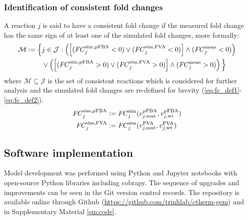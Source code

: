 \subsubsection{Identification of consistent fold changes}
A reaction $j$ is said to have a consistent fold change if the measured fold change has the same sign of at least one of the simulated fold changes, more formally:
\begin{equation} \label{eq:cons}
    \begin{aligned}
        \mathcal{M} := \Big\{ & j\in\mathcal{J}: \left( \left[ (\mathit{FC}_j^{\mathrm{sim},\mathrm{pFBA}}<0) \lor (\mathit{FC}_j^{\mathrm{sim},\mathrm{FVA}}<0) \right] \land (\mathit{FC}_j^{\mathrm{meas}}<0) \right) \\
        & \lor \left( \left[ (\mathit{FC}_j^{\mathrm{sim},\mathrm{pFBA}}>0) \lor (\mathit{FC}_j^{\mathrm{sim},\mathrm{FVA}}>0) \right] \land (\mathit{FC}_j^{\mathrm{meas}}>0) \right) \Big\}
    \end{aligned}
\end{equation}
where $\mathcal{M} \subseteq \mathcal{J}$ is the set of consistent reactions which is considered for further analysis and the simulated fold changes are re-defined for brevity (\ref{eq:fc_def1}-\ref{eq:fc_def2}).
\begin{alignat}{3}
    \mathit{FC}_j^{\mathrm{sim},\mathrm{pFBA}} &:= \mathit{FC}_j^{\mathrm{sim}} (v_{j,\text{mut}}^{\mathrm{pFBA}}, v_{j,\text{wt}}^{\mathrm{pFBA}}) \label{eq:fc_def1}\\
    \mathit{FC}_j^{\mathrm{sim},\mathrm{FVA}} &:= \mathit{FC}_j^{\mathrm{sim}} (v_{j,\text{mut}}^{\mathrm{FVA}}, v_{j,\text{wt}}^{\mathrm{FVA}}) \label{eq:fc_def2}
\end{alignat}


\subsection{Software implementation}
Model development was performed using Python and Jupyter notebooks with open-source Python libraries including cobrapy.\citep{ebrahim2016}
The sequence of upgrades and improvements can be seen in the Git version
control records. The repository is available online through Github (\url{https://github.com/trinhlab/ctherm-gem}) and in Supplementary Material \ref{sm:code}.

